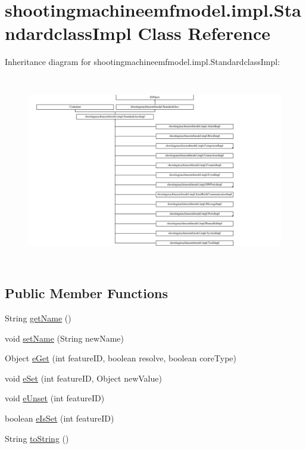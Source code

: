 \hypertarget{classshootingmachineemfmodel_1_1impl_1_1_standardclass_impl}{\section{shootingmachineemfmodel.\-impl.\-Standardclass\-Impl Class Reference}
\label{classshootingmachineemfmodel_1_1impl_1_1_standardclass_impl}
}
Inheritance diagram for shootingmachineemfmodel.\-impl.\-Standardclass\-Impl\-:\begin{figure}[H]
\begin{center}
\leavevmode
\includegraphics[height=8.342644cm]{classshootingmachineemfmodel_1_1impl_1_1_standardclass_impl}
\end{center}
\end{figure}
\subsection*{Public Member Functions}
\begin{DoxyCompactItemize}
\item 
String \hyperlink{classshootingmachineemfmodel_1_1impl_1_1_standardclass_impl_adfab6dbafe989bbcb5310c704caa683b}{get\-Name} ()
\item 
void \hyperlink{classshootingmachineemfmodel_1_1impl_1_1_standardclass_impl_a651bebba7c5ff55c473e66bdcc603af4}{set\-Name} (String new\-Name)
\item 
Object \hyperlink{classshootingmachineemfmodel_1_1impl_1_1_standardclass_impl_ab0fe73b10038e1699b6f680315597551}{e\-Get} (int feature\-I\-D, boolean resolve, boolean core\-Type)
\item 
void \hyperlink{classshootingmachineemfmodel_1_1impl_1_1_standardclass_impl_a4eb8c1ddee4dc5e3f5a96c3341d94862}{e\-Set} (int feature\-I\-D, Object new\-Value)
\item 
void \hyperlink{classshootingmachineemfmodel_1_1impl_1_1_standardclass_impl_a742a10d3e6547ef1834e2383432069c5}{e\-Unset} (int feature\-I\-D)
\item 
boolean \hyperlink{classshootingmachineemfmodel_1_1impl_1_1_standardclass_impl_aa63e87b4bf386d61477d3359425c579f}{e\-Is\-Set} (int feature\-I\-D)
\item 
String \hyperlink{classshootingmachineemfmodel_1_1impl_1_1_standardclass_impl_af6d97dd696551a18885837d9b6ac5c30}{to\-String} ()
\end{DoxyCompactItemize}
